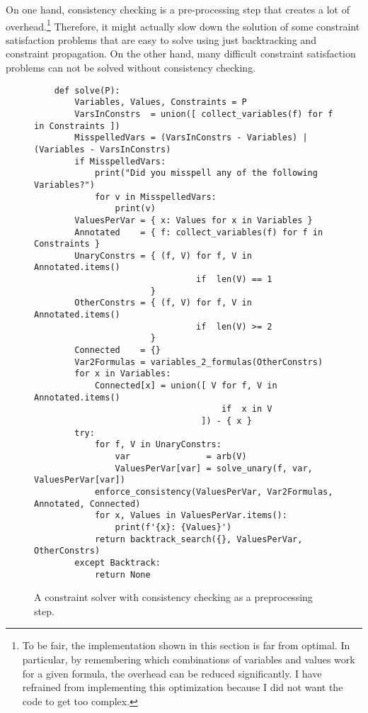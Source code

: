 On one hand, consistency checking is a pre-processing step that creates a lot of overhead.\footnote{
  To be fair, the implementation shown in this section is far from optimal.  In particular, by remembering which
  combinations of variables and values work for a given formula, the overhead can be reduced significantly.  I have
  refrained from implementing this optimization because I did not want the code to get too complex.
}
Therefore, it might actually slow down the
solution of some constraint satisfaction problems that are easy to solve using just backtracking and
constraint propagation.  On the other hand, many difficult constraint satisfaction problems can not be solved
without consistency checking. 


\begin{figure}[!ht]
\centering
\begin{verbatim}
    def solve(P):
        Variables, Values, Constraints = P
        VarsInConstrs  = union([ collect_variables(f) for f in Constraints ])
        MisspelledVars = (VarsInConstrs - Variables) | (Variables - VarsInConstrs)
        if MisspelledVars:
            print("Did you misspell any of the following Variables?")
            for v in MisspelledVars:
                print(v)
        ValuesPerVar = { x: Values for x in Variables }
        Annotated    = { f: collect_variables(f) for f in Constraints }
        UnaryConstrs = { (f, V) for f, V in Annotated.items() 
                                if  len(V) == 1 
                       }
        OtherConstrs = { (f, V) for f, V in Annotated.items() 
                                if  len(V) >= 2 
                       }
        Connected    = {}
        Var2Formulas = variables_2_formulas(OtherConstrs)
        for x in Variables:
            Connected[x] = union([ V for f, V in Annotated.items() 
                                     if  x in V 
                                 ]) - { x }
        try:
            for f, V in UnaryConstrs:
                var               = arb(V)
                ValuesPerVar[var] = solve_unary(f, var, ValuesPerVar[var])
            enforce_consistency(ValuesPerVar, Var2Formulas, Annotated, Connected)
            for x, Values in ValuesPerVar.items():
                print(f'{x}: {Values}')
            return backtrack_search({}, ValuesPerVar, OtherConstrs)
        except Backtrack:
            return None
\end{verbatim}
\vspace*{-0.3cm}
\caption{A constraint solver with consistency checking as a preprocessing step.}
\label{fig:Consistency-Solver.ipynb:solve}
\end{figure}

